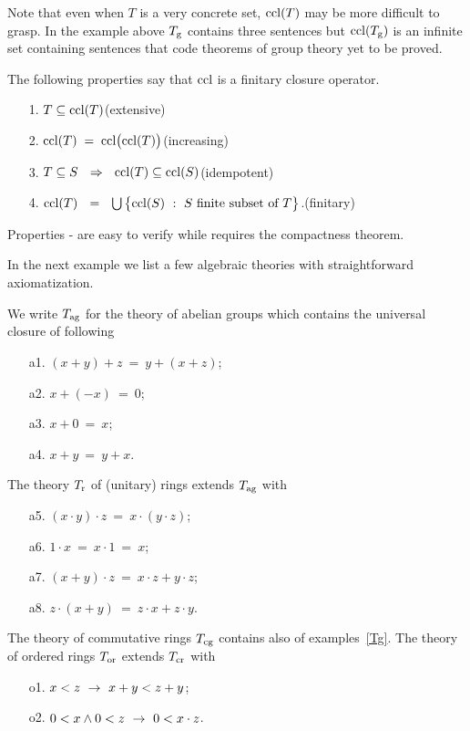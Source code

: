 \documentclass[creche.tex]{subfiles}
\begin{document}
Note that even when $T$ is a very concrete set, ${\rm ccl}(T)$ may be more difficult to grasp. In the example above $T_{\rm g}$ contains three sentences but ${\rm ccl}(T_{\rm g})$ is an infinite set containing sentences that code theorems of group theory yet to be proved.

\begin{remark}
The following properties say that ${\rm ccl}$ is a finitary closure operator.
\begin{itemize}
\item[1.] $T\subseteq{\rm ccl}(T)$\hfill (extensive)
\item[2.] ${\rm ccl}(T)\;=\;{\rm ccl}\big({\rm ccl}(T)\big)$\hfill (increasing)
\item[3.] $T\subseteq S\ \ \IMP\ \ \ccl(T)\subseteq\ccl(S)$\hfill (idempotent)
\item[4.] ${\rm ccl}(T)\ \ =\ \ \bigcup\big\{{\rm ccl}(S)\ :\ S \textrm{ finite subset of } T\big\}$.\hfill (finitary)
\end{itemize}
Properties - are easy to verify while  requires the compactness theorem.\QED
\end{remark}

In the next example we list a few algebraic theories with straightforward axiomatization.

\begin{example}
We write $T_{\rm ag}$ for the theory of abelian groups which contains the universal closure of following
\begin{itemize}
\item[a1.] $(x+y) +z\ =\ y+(x+z)$;
\item[a2.] $x+(-x)\ =\ 0$;
\item[a3.] $x+0\ = \ x$;
\item[a4.] $x+y\ =\ y+x$.
\end{itemize}
The theory $T_{\rm r}$ of (unitary) rings extends $T_{\rm ag}$ with
\begin{itemize}
\item[a5.] $(x\cdot  y)\cdot  z\  =\ x\cdot (y\cdot  z)$;
\item[a6.] $1\cdot  x\ =\ x\cdot  1\ =\ x$;
\item[a7.] $(x+y)\cdot  z\ =\ x\cdot  z + y\cdot  z$;
\item[a8.] $z\cdot  (x+y)\ =\ z\cdot  x + z\cdot  y$.
\end{itemize}
The theory of commutative rings $T_{\rm cg}$ contains also  of examples~\ref{Tg}. The theory of ordered rings $T_{\rm or}$ extends $T_{\rm cr}$ with
\begin{itemize}
\item[o1.] $x<z\ \rightarrow\ x+y<z+y$;
\item[o2.] $0<x \wedge 0<z\ \rightarrow\ 0<x\cdot z$.\QED
\end{itemize}
\end{example}
\end{document}
